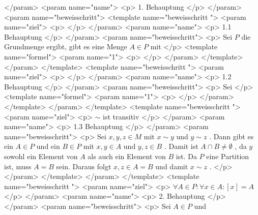        </param>
       <param name="name">
        <p>
         1. Behauptung
        </p>
       </param>
       <param name="beweisschritt">
        <template name="beweisschritt
 ">
         <param name="ziel">
          <p>
          </p>
         </param>
         <param name="name">
          <p>
           1.1 Behauptung
          </p>
         </param>
         <param name="beweisschritt">
          <p>
           Sei
           $P$
           die Grundmenge ergibt, gibt es eine Menge
           $A\in P$
           mit
          </p>
          <template name="formel">
           <param name="1">
            <p>
            </p>
           </param>
          </template>
         </param>
        </template>
        <template name="beweisschritt
 ">
         <param name="ziel">
          <p>
          </p>
         </param>
         <param name="name">
          <p>
           1.2 Behauptung
          </p>
         </param>
         <param name="beweisschritt">
          <p>
           Sei
          </p>
          <template name="formel">
           <param name="1">
            <p>
            </p>
           </param>
          </template>
         </param>
        </template>
        <template name="beweisschritt
 ">
         <param name="ziel">
          <p>
           $\sim$
           ist transitiv
          </p>
         </param>
         <param name="name">
          <p>
           1.3 Behauptung
          </p>
         </param>
         <param name="beweisschritt">
          <p>
           Sei
           $x,y,z\in M$
           mit
           $x\sim y$
           und
           $y\sim z$
           . Dann gibt es ein
           $A\in P$
           und ein
           $B\in P$
           mit
           $x,y\in A$
           und
           $y,z\in B$
           . Damit ist
           $A\cap B\ne \emptyset$
           , da
           $y$
           sowohl ein Element von
           $A$
           als auch ein Element von
           $B$
           ist. Da
           $P$
           eine Partition ist, muss
           $A=B$
           sein. Daraus folgt
           $x,z\in A=B$
           und damit
           $x\sim z$
           .
          </p>
         </param>
        </template>
       </param>
      </template>
      <template name="beweisschritt
 ">
       <param name="ziel">
        <p>
         $\forall A\in P:\forall x\in A: [x]=A$
        </p>
       </param>
       <param name="name">
        <p>
         2. Behauptung
        </p>
       </param>
       <param name="beweisschritt">
        <p>
         Sei
         $A\in P$
         und
